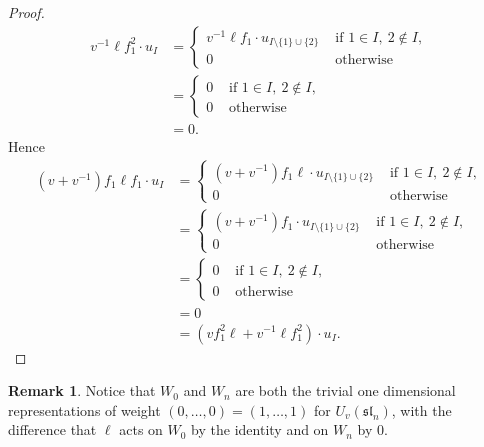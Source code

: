\documentclass{amsart}
\numberwithin{equation}{section}
\theoremstyle{theorem}
\theoremstyle{definition}
\newtheorem{remark}[theorem]{Remark}
\newcommand{\sll}{\mathfrak{sl}}
\newcommand{\uvsln}{U_v(\sll_n)}
\begin{document}
\begin{proof}
\begin{align*}v^{-1}\ell f_1^2\cdot u_I&=\begin{cases}v^{-1}\ell f_1\cdot u_{I\setminus\{1\}\cup\{2\}} & \text{ if }1\in I,~2\not\in I, \\
 0 & \text{ otherwise }\end{cases} \\
 &=\begin{cases}0 & \text{ if }1\in I,~2\not\in I,\\
 0 & \text{ otherwise }\end{cases} \\
&=0.\end{align*}
Hence
\begin{align*}(v+v^{-1})f_1\ell f_1\cdot u_I&=\begin{cases}(v+v^{-1})f_1\ell\cdot u_{I\setminus\{1\}\cup\{2\}} & \text{ if }1\in I,~2\not\in I,\\
 0 & \text{ otherwise }\end{cases} \\
 &=\begin{cases}(v+v^{-1})f_1\cdot u_{I\setminus\{1\}\cup\{2\}} & \text{ if }1\in I,~2\not\in I,\\
 0 & \text{ otherwise }\end{cases} \\
&=\begin{cases}0 & \text{ if }1\in I,~2\not\in I,\\
 0 & \text{ otherwise }\end{cases} \\
 &=0 \\
 &= (vf_1^2\ell+v^{-1}\ell f_1^2)\cdot u_I.\end{align*}
\end{proof}
\begin{remark}
Notice that $W_0$ and $W_n$ are both the trivial one dimensional representations of weight $(0,\ldots,0)=(1,\ldots,1)$ for $\uvsln$, with the difference that $\ell$ acts on $W_0$ by the identity and on $W_n$ by $0$.     
\end{remark}
\end{document}
